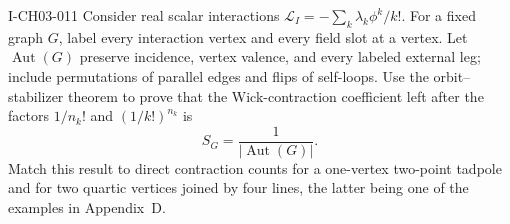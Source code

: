\begin{exercise}{I-CH03-011}
Consider real scalar interactions
\(\mathcal L_I=-\sum_k\lambda_k\phi^k/k!\).  For a fixed graph $G$, label
every interaction vertex and every field slot at a vertex.  Let
$\operatorname{Aut}(G)$ preserve incidence, vertex valence, and every labeled
external leg; include permutations of parallel edges and flips of self-loops.
Use the orbit--stabilizer theorem to prove that the Wick-contraction
coefficient left after the factors $1/n_k!$ and $(1/k!)^{n_k}$ is
\[
 S_G=\frac{1}{|\operatorname{Aut}(G)|}.
\]
Match this result to direct contraction counts for a one-vertex two-point
tadpole and for two quartic vertices joined by four lines, the latter being
one of the examples in Appendix~D.
\end{exercise}

